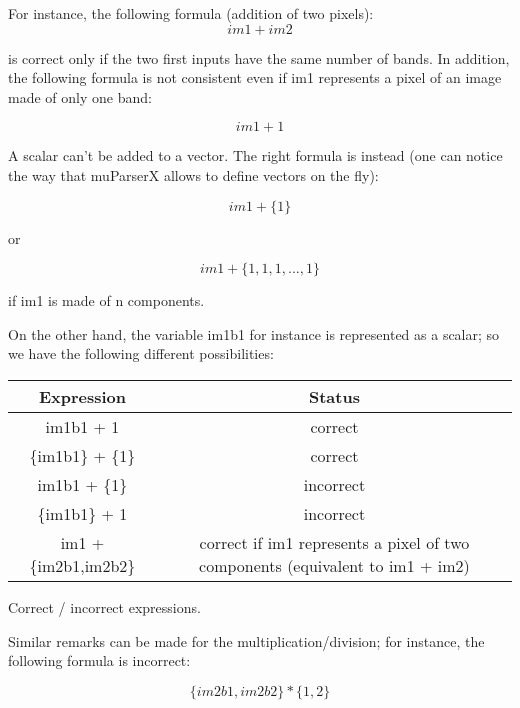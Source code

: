 \newline

For instance, the following formula (addition of two pixels):
\begin{equation}
  im1+im2
\end{equation}
\label{firstequation}

is correct only if the two first inputs have the same number of bands. In addition, the following formula is not consistent even if im1 represents a pixel of an image made of only one band:

\begin{equation}
  im1+1
\end{equation}

A scalar can't be added to a vector. The right formula is instead (one can notice the way that muParserX allows to define vectors on the fly):

\begin{equation}
  im1+\{ 1 \}
\end{equation}


or

\begin{equation}
  im1 + \{1,1,1,...,1\}
\end{equation}

if im1 is made of n components. 

On the other hand, the variable im1b1 for instance is represented as a scalar; so we have the following different possibilities:

\begin{center} 
\begin{tabular}{||c|c||}
\hline
\bf Expression & \bf Status \\
\hline\hline
im1b1 + 1 & correct \\
\{im1b1\} + \{1\} & correct \\
im1b1 + \{1\} & incorrect \\
\{im1b1\} + 1 & incorrect \\
im1 + \{im2b1,im2b2\} & correct if im1 represents a pixel of two components (equivalent to  im1 + im2) \\
\hline
\end{tabular}
\end{center}
\caption{Correct / incorrect expressions.}
\label{correctness}


Similar remarks can be made for the multiplication/division; for instance, the following formula is incorrect:

\begin{equation}
  \{im2b1,im2b2\} * \{1,2\}
\end{equation}

